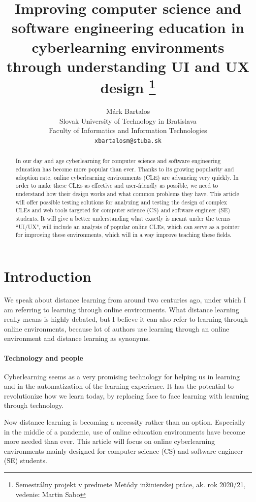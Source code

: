 \documentclass[10pt,english,a4paper]{article}
\title{Improving computer science and software 
engineering education in cyberlearning 
environments through understanding UI and UX design
\thanks{Semestrálny projekt v predmete Metódy inžinierskej práce,
 ak. rok 2020/21, vedenie: Martin Sabo}}
\author{Márk Bartalos \\[2pt]
        \small{Slovak University of Technology in Bratislava}\\
        \small{Faculty of Informatics and Information Technologies}\\
        \small{\texttt{xbartalosm@stuba.sk}}
}
\begin{document}
\maketitle

\begin{abstract}
    In our day and age cyberlearning for computer science and software engineering education has become more popular than ever.
    Thanks to its growing popularity and adoption rate, online cyberlearning environments (CLE) are advancing very quickly.
    In order to make these CLEs as effective and user-friendly as possible, we need to understand how their design
    works and what common problems they have. This article will offer possible testing solutions for analyzing and testing
    the design of complex CLEs and web tools targeted for computer science (CS) and software engineer (SE) students. 
    It will give a better understanding what exactly is meant under the terms ``UI/UX", will include an analysis of
    popular online CLEs, which can serve as a pointer for improving these environments, which will in a way improve teaching these fields.
\end{abstract}



\section{Introduction}
We speak about distance learning from around two centuries ago, under which
I am referring to learning through online environments\cite{moore_2011_elearning}. What distance learning really means is highly debated,
but I believe it can also refer to learning through online environments, because lot of authors use learning through an online environment and distance learning as
synonyms\cite{moore_2011_elearning}\cite{distance_definition}. 
\paragraph{Technology and people}
Cyberlearning seems as a very promising technology for helping us in learning and in the automatization of the learning
experience. It has the potential to revolutionize how we learn today, by replacing face to face learning with
learning through technology.

Now distance learning is becoming a necessity rather than an option. Especially in the middle of a pandemic, use of online 
education environments have become more needed than ever. This article will focus on online cyberlearning environments 
mainly designed for computer science (CS) and software engineer (SE) students.
\end{document}
